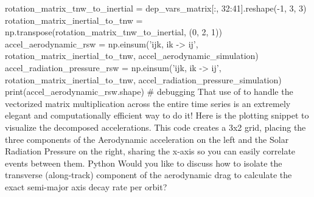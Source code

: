 \markdownRendererInterblockSeparator
{}
\markdownRendererSectionEnd \markdownRendererSectionBegin
{}\markdownRendererInterblockSeparator
{}rotation_matrix_tnw_to_inertial = dep_vars_matrix[:, 32:41].reshape(-1, 3, 3) rotation_matrix_inertial_to_tnw = np.transpose(rotation_matrix_tnw_to_inertial, (0, 2, 1))\markdownRendererInterblockSeparator
{}
\markdownRendererSectionEnd \markdownRendererSectionBegin
{}\markdownRendererInterblockSeparator
{}
\markdownRendererSectionEnd \markdownRendererSectionBegin
{}\markdownRendererInterblockSeparator
{}
\markdownRendererSectionEnd \markdownRendererSectionBegin
{}\markdownRendererInterblockSeparator
{}accel_aerodynamic_rsw = np.einsum('ijk, ik -> ij', rotation_matrix_inertial_to_tnw, accel_aerodynamic_simulation) accel_radiation_pressure_rsw = np.einsum('ijk, ik -> ij', rotation_matrix_inertial_to_tnw, accel_radiation_pressure_simulation) print(accel_aerodynamic_rsw.shape) # debugging\markdownRendererInterblockSeparator
{}\markdownRendererSectionBegin
{}\markdownRendererInterblockSeparator
{}That use of  to handle the vectorized matrix multiplication across the entire time series is an extremely elegant and computationally efficient way to do it!\markdownRendererInterblockSeparator
{}Here is the plotting snippet to visualize the decomposed accelerations. This code creates a 3x2 grid, placing the three components of the Aerodynamic acceleration on the left and the Solar Radiation Pressure on the right, sharing the x-axis so you can easily correlate events between them.\markdownRendererInterblockSeparator
{}\markdownRendererInterblockSeparator
{}Python\markdownRendererInterblockSeparator
{}\markdownRendererInterblockSeparator
{}Would you like to discuss how to isolate the transverse (along-track) component of the aerodynamic drag to calculate the exact semi-major axis decay rate per orbit?\markdownRendererInterblockSeparator
